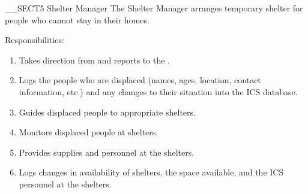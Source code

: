 __SECT5{ Shelter Manager 
\label{sec:ShelterManager} }
The Shelter Manager arranges temporary shelter for people who cannot stay 
in their homes.

Responsibilities:
\begin{enumerate}
\item Takes direction from and reports to the \EquipmentManager.
\item Logs the people who are displaced (names, ages, location, contact information, etc.) and any changes to their situation into the ICS database.
\item Guides displaced people to appropriate shelters.
\item Monitors displaced people at shelters. 
\item Provides supplies and personnel at the shelters.
\item Logs changes in availability of shelters, the space available, and the ICS personnel at the shelters.
\end{enumerate}

